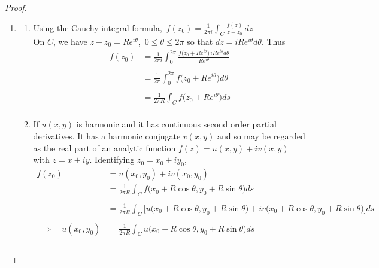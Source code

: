 \documentclass[11pt,a4paper]{article}
\theoremstyle{definition}
\begin{document}
\begin{proof}
\begin{enumerate}
\item[]
\begin{enumerate}
      \item Using the Cauchy integral formula, $\,\displaystyle{f(z_0) = \frac{1}{2\pi i}\int_C \frac{f(z)}{z - z_0}\,dz}$\\
      
      On $C$, we have $z - z_0 = Re^{i\theta}$, $\, 0\leq \theta \leq 2\pi$ so that $dz = iRe^{i\theta}d\theta$. Thus
      \begin{align*}
      f(z_0) & = \frac{1}{2\pi i} \int_0^{2\pi} \frac{f\Big(z_0 + Re^{i\theta}\Big)\, iRe^{i\theta}d\theta}{Re^{i\theta}}\\\\
      & = \frac{1}{2\pi}\int_0^{2\pi}f\Big(z_0 + Re^{i\theta}\Big)d\theta\\\\
      & = \frac{1}{2\pi R} \int_C f\Big(z_0 + Re^{i\theta}\Big)ds\\
      \end{align*}
      
      
      \item If $u(x,y)$ is harmonic and it has continuous second order partial derivatives. It has a harmonic conjugate $v(x,y)$ and so may be regarded as the real part of an analytic function $f(z) = u(x,y) + iv(x,y)$ with $z = x + iy$. Identifying $z_0 = x_0 + iy_0$,
      \begin{align*}
      f(z_0) &  = u(x_0, y_0) + i v(x_0,y_0)\\
      & = \frac{1}{2\pi R}\int_C f\Big(x_0 + R\cos \theta, y_0+R\sin \theta\Big)ds\\\\
      & = \frac{1}{2\pi R}\int_C\Big[u\Big(x_0 + R\cos \theta, y_0+R\sin \theta\Big) + i v\Big(x_0 + R\cos \theta, y_0+R\sin \theta\Big)\Big]ds\\\\
      \implies \quad  u(x_0,y_0) & = \frac{1}{2\pi R}\int_Cu\Big(x_0 + R\cos \theta, y_0+R\sin \theta\Big)ds\\\\
      \end{align*}
\end{enumerate}
\end{enumerate}
\end{proof}
\end{document}
